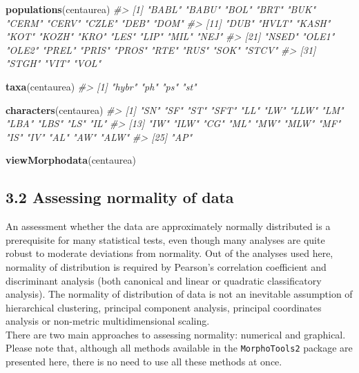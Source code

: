 \documentclass[
]{article}
\newenvironment{Shaded}{\begin{snugshade}}{\end{snugshade}}
\newcommand{\CommentTok}[1]{\textcolor[rgb]{0.56,0.35,0.01}{\textit{#1}}}
\newcommand{\KeywordTok}[1]{\textcolor[rgb]{0.13,0.29,0.53}{\textbf{#1}}}
\newcommand{\NormalTok}[1]{#1}
\begin{document}
\begin{Shaded}
\begin{Highlighting}[]
\KeywordTok{populations}\NormalTok{(centaurea)}
\CommentTok{#>  [1] "BABL" "BABU" "BOL"  "BRT"  "BUK"  "CERM" "CERV" "CZLE" "DEB"  "DOM" }
\CommentTok{#> [11] "DUB"  "HVLT" "KASH" "KOT"  "KOZH" "KRO"  "LES"  "LIP"  "MIL"  "NEJ" }
\CommentTok{#> [21] "NSED" "OLE1" "OLE2" "PREL" "PRIS" "PROS" "RTE"  "RUS"  "SOK"  "STCV"}
\CommentTok{#> [31] "STGH" "VIT"  "VOL"}
\end{Highlighting}
\end{Shaded}

\begin{Shaded}
\begin{Highlighting}[]
\KeywordTok{taxa}\NormalTok{(centaurea)}
\CommentTok{#> [1] "hybr" "ph"   "ps"   "st"}
\end{Highlighting}
\end{Shaded}

\begin{Shaded}
\begin{Highlighting}[]
\KeywordTok{characters}\NormalTok{(centaurea)}
\CommentTok{#>  [1] "SN"  "SF"  "ST"  "SFT" "LL"  "LW"  "LLW" "LM"  "LBA" "LBS" "LS"  "IL" }
\CommentTok{#> [13] "IW"  "ILW" "CG"  "ML"  "MW"  "MLW" "MF"  "IS"  "IV"  "AL"  "AW"  "ALW"}
\CommentTok{#> [25] "AP"}
\end{Highlighting}
\end{Shaded}

\begin{Shaded}
\begin{Highlighting}[]
\KeywordTok{viewMorphodata}\NormalTok{(centaurea)}
\end{Highlighting}
\end{Shaded}

\hypertarget{assessing-normality-of-data}{%
\subsection{3.2 Assessing normality of
data}\label{assessing-normality-of-data}}

An assessment whether the data are approximately normally distributed is
a prerequisite for many statistical tests, even though many analyses are
quite robust to moderate deviations from normality. Out of the analyses
used here, normality of distribution is required by Pearson's
correlation coefficient and discriminant analysis (both canonical and
linear or quadratic classificatory analysis). The normality of
distribution of data is not an inevitable assumption of hierarchical
clustering, principal component analysis, principal coordinates analysis
or non-metric multidimensional scaling.\\
There are two main approaches to assessing normality: numerical and
graphical. Please note that, although all methods available in the
\texttt{MorphoTools2} package are presented here, there is no need to
use all these methods at once.
\end{document}
